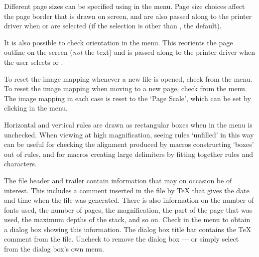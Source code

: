\unvpar

Different page sizes can be specified using  in the
 menu. %
Page size choices affect the page border that is drawn on screen, 
and are also passed along to the printer driver when 
 or  %
are selected
(if the selection is other than , the default).


It is also possible to check  orientation 
in the  menu.
This reorients the page outline on the screen 
({\it not\/} the text) and is passed along to the
printer driver when the user 
selects  or . %

To reset the image mapping %
whenever a new file is opened, check  
from the  menu.
To reset the image mapping %
when moving to a new page, check  
from the  menu.
The image mapping in each case is reset to the `Page Scale', which can
be set by clicking  in the  menu.

Horizontal and vertical rules are drawn as rectangular boxes
when  in the  menu is unchecked.
When viewing at high magnification, seeing rules `unfilled' in this way
can be useful for checking the alignment produced by macros
constructing `boxes' out of rules, 
and for macros creating large delimiters %
by fitting together rules and characters.


The {\DVI} file header and trailer contain information that may on
occasion be of interest.
This includes a comment inserted in the file by {\TeX} that gives the
date and time when the {\DVI} file was generated.
There is also information on 
the number of fonts used, 
the number of pages,
the magnification,
the part of the page that was used,
the maximum depths of the stack, and so on.
Check  in the  %
menu to obtain a dialog box showing this information.
The dialog box title bar contains the {\TeX} comment from the {\DVI} file.
Uncheck  to remove the dialog box --- or simply
select  from the dialog box's own  menu.

